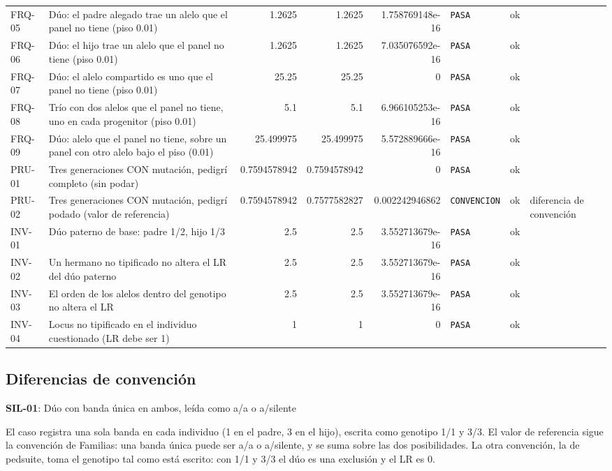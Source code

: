 \documentclass[11pt,a4paper]{article}
\begin{document}
\begin{landscape}
\begin{longtable}{@{}lp{268pt}rrrlll@{}}
FRQ-05 & Dúo: el padre alegado trae un alelo que el panel no tiene (piso 0.01) & 1.2625 & 1.2625 & 1.758769148e-16 & \textcolor{pasa}{\texttt{PASA}} & ok &  \\
FRQ-06 & Dúo: el hijo trae un alelo que el panel no tiene (piso 0.01) & 1.2625 & 1.2625 & 7.035076592e-16 & \textcolor{pasa}{\texttt{PASA}} & ok &  \\
FRQ-07 & Dúo: el alelo compartido es uno que el panel no tiene (piso 0.01) & 25.25 & 25.25 & 0 & \textcolor{pasa}{\texttt{PASA}} & ok &  \\
FRQ-08 & Trío con dos alelos que el panel no tiene, uno en cada progenitor (piso 0.01) & 5.1 & 5.1 & 6.966105253e-16 & \textcolor{pasa}{\texttt{PASA}} & ok &  \\
FRQ-09 & Dúo: alelo que el panel no tiene, sobre un panel con otro alelo bajo el piso (0.01) & 25.499975 & 25.499975 & 5.572889666e-16 & \textcolor{pasa}{\texttt{PASA}} & ok &  \\
PRU-01 & Tres generaciones CON mutación, pedigrí completo (sin podar) & 0.7594578942 & 0.7594578942 & 0 & \textcolor{pasa}{\texttt{PASA}} & ok &  \\
PRU-02 & Tres generaciones CON mutación, pedigrí podado (valor de referencia) & 0.7594578942 & 0.7577582827 & 0.002242946862 & \textcolor{revisar}{\texttt{CONVENCION}} & ok & diferencia de convención \\
INV-01 & Dúo paterno de base: padre 1/2, hijo 1/3 & 2.5 & 2.5 & 3.552713679e-16 & \textcolor{pasa}{\texttt{PASA}} & ok &  \\
INV-02 & Un hermano no tipificado no altera el LR del dúo paterno & 2.5 & 2.5 & 3.552713679e-16 & \textcolor{pasa}{\texttt{PASA}} & ok &  \\
INV-03 & El orden de los alelos dentro del genotipo no altera el LR & 2.5 & 2.5 & 3.552713679e-16 & \textcolor{pasa}{\texttt{PASA}} & ok &  \\
INV-04 & Locus no tipificado en el individuo cuestionado (LR debe ser 1) & 1 & 1 & 0 & \textcolor{pasa}{\texttt{PASA}} & ok &  \\
\end{longtable}
\endgroup
\end{landscape}
\subsection{Diferencias de convención}
\textbf{SIL-01}: Dúo con banda única en ambos, leída como a/a o a/silente

El caso registra una sola banda en cada individuo (1 en el padre, 3 en el hijo), escrita como genotipo 1/1 y 3/3. El valor de referencia sigue la convención de Familias: una banda única puede ser a/a o a/silente, y se suma sobre las dos posibilidades. La otra convención, la de pedsuite, toma el genotipo tal como está escrito: con 1/1 y 3/3 el dúo es una exclusión y el LR es 0.
\end{document}
